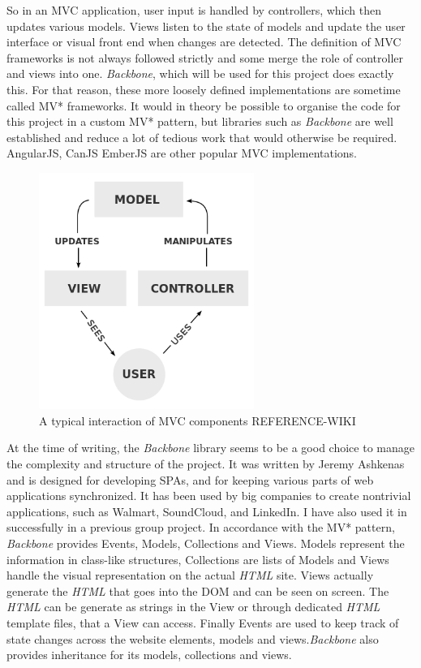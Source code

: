 \documentclass[a4paper,11pt,twoside]{article}
\begin{document}
So in an MVC application, user input is handled by controllers, which then updates various models. Views listen to the state of models and update the user interface or visual front end when changes are detected. The definition of MVC frameworks is not always followed strictly and some merge the role of controller and views into one. \textit{Backbone}, which will be used for this project does exactly this. For that reason, these more loosely defined implementations are sometime called MV* frameworks. It would in theory be possible to organise the code for this project in a custom MV* pattern, but libraries such as \textit{Backbone} are well established and reduce a lot of tedious work that would otherwise be required. AngularJS, CanJS EmberJS are other popular MVC implementations.

\begin{figure}[ht!]
\centering
\includegraphics[width=70mm]{graphics/MVC_01.png}
\caption{A typical interaction of MVC components REFERENCE-WIKI}
\label{fig:UIdesign1}
\end{figure}


At the time of writing, the \textit{Backbone} library seems to be a good choice to manage the complexity and structure of the project. It was written by Jeremy Ashkenas and is designed for developing SPAs, and for keeping various parts of web applications synchronized. It has been used by big companies to create nontrivial applications, such as Walmart, SoundCloud, and LinkedIn. I have also used it in successfully in a previous group project. In accordance with the MV* pattern, \textit{Backbone} provides Events, Models, Collections and Views. Models represent the information in class-like structures, Collections are lists of Models and Views handle the visual representation on the actual \textit{HTML} site. Views actually generate the \textit{HTML} that goes into the DOM and can be seen on screen. The \textit{HTML} can be generate as strings in the View or through dedicated \textit{HTML} template files, that a View can access. Finally Events are used to keep track of state changes across the website elements, models and views.\textit{Backbone} also provides inheritance for its models, collections and views.
\end{document}
